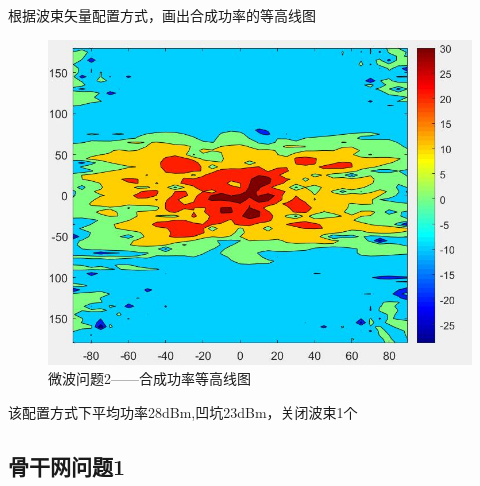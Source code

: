 \documentclass[UTF8,12pt]{ctexart}
\begin{document}
        根据波束矢量配置方式，画出合成功率的等高线图
            \begin{figure}[H]
          \centering
          \includegraphics[scale=0.5]{h2.jpg}
          \caption{微波问题2——合成功率等高线图}
          \end{figure} 
          该配置方式下平均功率28dBm,凹坑23dBm，关闭波束1个
    


    \subsection{骨干网问题1}
\end{document}
